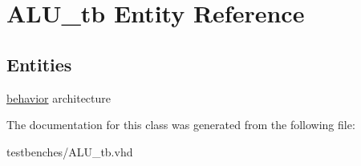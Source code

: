 \hypertarget{class_a_l_u__tb}{\section{\-A\-L\-U\-\_\-tb \-Entity \-Reference}
\label{class_a_l_u__tb}
}
\subsection*{\-Entities}
\begin{DoxyCompactItemize}
\item 
\hyperlink{class_a_l_u__tb_1_1behavior}{behavior} architecture
\end{DoxyCompactItemize}


\-The documentation for this class was generated from the following file\-:\begin{DoxyCompactItemize}
\item 
testbenches/\-A\-L\-U\-\_\-tb.\-vhd\end{DoxyCompactItemize}
